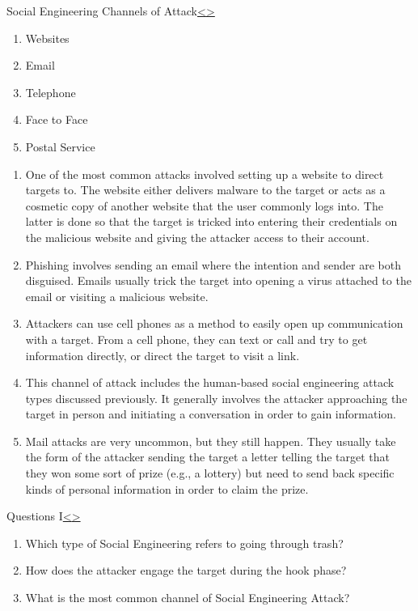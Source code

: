 \documentclass[12pt]{extarticle}
\newenvironment{instructionblock}{\Large\bgroup}{\egroup}
\begin{document}
\begin{slide}{Social Engineering Channels of Attack}{\hyperref[slide 13]{\textless}\hyperref[slide 15]{\textgreater}}
	\begin{instructionblock}
		\begin{enumerate}
			\item Websites
			\item Email
			\item Telephone
			\item Face to Face
			\item Postal Service
		\end{enumerate}
	\end{instructionblock}
\end{slide}
\begin{enumerate}
	\item One of the most common attacks involved setting up a website to direct targets to. The website either delivers malware to the target or acts as a cosmetic copy of another website that the user commonly logs into. The latter is done so that the target is tricked into entering their credentials on the malicious website and giving the attacker access to their account.\cite{b2}
	\item Phishing involves sending an email where the intention and sender are both disguised. Emails usually trick the target into opening a virus attached to the email or visiting a malicious website.\cite{b2}
	\item Attackers can use cell phones as a method to easily open up communication with a target. From a cell phone, they can text or call and try to get information directly, or direct the target to visit a link.\cite{b2}
	\item This channel of attack includes the human-based social engineering attack types discussed previously. It generally involves the attacker approaching the target in person and initiating a conversation in order to gain information.\cite{b2}
	\item Mail attacks are very uncommon, but they still happen. They usually take the form of the attacker sending the target a letter telling the target that they won some sort of prize (e.g., a lottery) but need to send back specific kinds of personal information in order to claim the prize.\cite{b2}
	
\end{enumerate}

\pagebreak
\begin{slide}{Questions I}{\hyperref[slide 15]{\textless}\hyperref[slide 17]{\textgreater}}
\vskip 5pt
\begin{instructionblock}
	\begin{enumerate}
	\item Which type of Social Engineering refers to going through trash?
	\item How does the attacker engage the target during the hook phase?
	\item What is the most common channel of Social Engineering Attack?
	\end{enumerate}

\end{instructionblock}
\end{slide}
\end{document}
